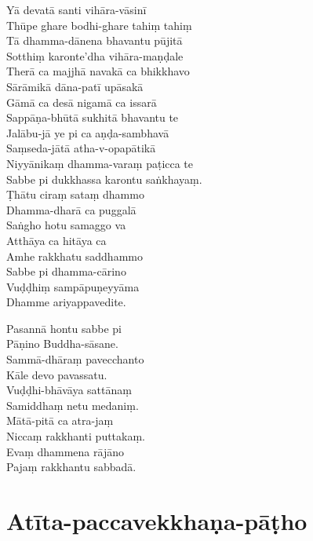 Yā devatā santi vihāra-vāsinī\\
Thūpe ghare bodhi-ghare tahiṃ tahiṃ\\
Tā dhamma-dānena bhavantu pūjitā\\
Sotthiṃ karonte'dha vihāra-maṇḍale\\
Therā ca majjhā navakā ca bhikkhavo\\
Sārāmikā dāna-patī upāsakā\\
Gāmā ca desā nigamā ca issarā\\
Sappāṇa-bhūtā sukhitā bhavantu te\\
Jalābu-jā ye pi ca aṇḍa-sambhavā\\
Saṃseda-jātā atha-v-opapātikā\\
Niyyānikaṃ dhamma-varaṃ paṭicca te\\
Sabbe pi dukkhassa karontu saṅkhayaṃ.\\
Ṭhātu ciraṃ sataṃ dhammo\\
Dhamma-dharā ca puggalā\\
Saṅgho hotu samaggo va\\
Atthāya ca hitāya ca\\
Amhe rakkhatu saddhammo\\
Sabbe pi dhamma-cārino\\
Vuḍḍhiṃ sampāpuṇeyyāma\\
Dhamme ariyappavedite.

\clearpage

\sidepar{\pointerMark}%
Pasannā hontu sabbe pi\\
Pāṇino Buddha-sāsane.\\
Sammā-dhāraṃ pavecchanto\\
Kāle devo pavassatu.\\
Vuḍḍhi-bhāvāya sattānaṃ\\
Samiddhaṃ netu medaniṃ.\\
Mātā-pitā ca atra-jaṃ\\
Niccaṃ rakkhanti puttakaṃ.\\
Evaṃ dhammena rājāno\\
Pajaṃ rakkhantu sabbadā.

\section{Atīta-paccavekkhaṇa-pāṭho}



\begin{leader}
\end{leader}

